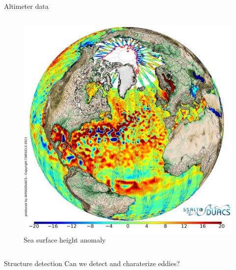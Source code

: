 \documentclass[handout]{beamer}
\begin{document}
\begin{frame}{Altimeter data}
\begin{columns}[t]
    \begin{figure}
        \centering
        \caption*{Sea surface height anomaly}
         \includegraphics[width=.9\textwidth]{fig/L3/eddies.png}
    \end{figure}

    \end{columns}
    \begin{block}{Structure detection}
    Can we detect and charaterize eddies?
    \end{block}
\end{frame}
\end{document}
